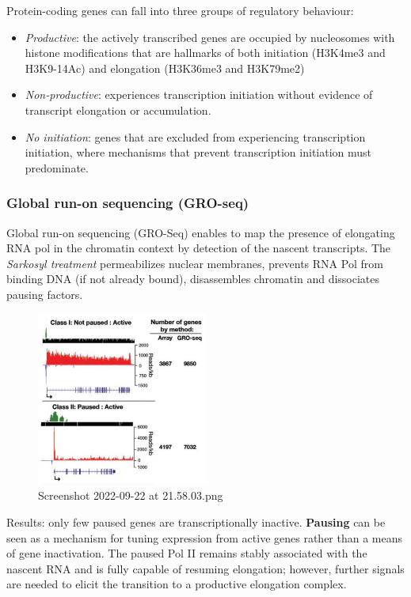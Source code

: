 Protein-coding genes can fall into three groups of regulatory behaviour:

\begin{itemize}
\tightlist
\item
  \emph{Productive}: the actively transcribed genes are occupied by nucleosomes with histone modifications that are hallmarks of both initiation (H3K4me3 and H3K9-14Ac) and elongation (H3K36me3 and H3K79me2)
\item
  \emph{Non-productive}: experiences transcription initiation without evidence of transcript elongation or accumulation.
\item
  \emph{No initiation}: genes that are excluded from experiencing transcription initiation, where mechanisms that prevent transcription initiation must predominate.
\end{itemize}

\hypertarget{global-run-on-sequencing-gro-seq}{%
\subsubsection{Global run-on sequencing (GRO-seq)}\label{global-run-on-sequencing-gro-seq}}

Global run-on sequencing (GRO-Seq) enables to map the presence of elongating RNA pol in the chromatin context by detection of the nascent transcripts. The \emph{Sarkosyl treatment} permeabilizes nuclear membranes, prevents RNA Pol from binding DNA (if not already bound), disassembles chromatin and dissociates pausing factors.

\begin{figure}
\centering
\includegraphics[width=0.5\textwidth]{../_resources/Screenshot_2022-09-22_at_21-58-03.png}
\caption{Screenshot 2022-09-22 at 21.58.03.png}
\end{figure}

Results: only few paused genes are transcriptionally inactive.
\textbf{Pausing} can be seen as a mechanism for tuning expression from active genes rather than a means of gene inactivation. The paused Pol II remains stably associated with the nascent RNA and is fully capable of resuming elongation; however, further signals are needed to elicit the transition to a productive elongation complex.

